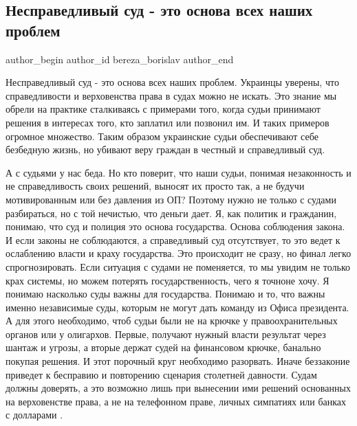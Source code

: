  
 
 
 
 
 
\subsection{Несправедливый суд - это основа всех наших проблем}
\label{sec:28_10_2021.fb.bereza_borislav.1.nespravedlivyj_sud}
 
\ifcmt
 author_begin
   author_id bereza_borislav
 author_end
\fi

Несправедливый суд - это основа всех наших проблем. Украинцы уверены, что
справедливости и верховенства права в судах можно не искать. Это знание мы
обрели на практике сталкиваясь с примерами того, когда судьи принимают решения
в интересах того, кто заплатил или позвонил им. И таких примеров огромное
множество. Таким образом украинские судьи обеспечивают себе безбедную жизнь, но
убивают веру граждан в честный и справедливый суд.

А с судьями у нас беда. Но кто поверит, что наши судьи, понимая незаконность и
не справедливость своих решений, выносят их просто так, а не будучи
мотивированным или без давления из ОП? Поэтому нужно не только с судами
разбираться, но с той нечистью, что деньги дает. Я, как политик и гражданин,
понимаю, что суд и полиция это основа государства. Основа соблюдения закона. И
если законы не соблюдаются, а справедливый суд отсутствует, то это ведет к
ослаблению власти и краху государства. Это происходит не сразу, но финал легко
спрогнозировать. Если ситуация с судами не поменяется, то мы увидим не только
крах системы, но можем потерять государственность, чего я точноне хочу. Я
понимаю насколько суды важны для государства. Понимаю и то, что важны именно
независимые суды, которым не могут дать команду из Офиса президента. А для
этого необходимо, чтоб судьи были не на крючке у правоохранительных органов или
у олигархов. Первые, получают нужный власти результат через шантаж и угрозы, а
вторые держат судей на финансовом крючке, банально покупая решения. И этот
порочный круг необходимо разорвать. Иначе беззаконие приведет к бесправию и
повторению сценария столетней давности. Судам должны доверять, а это возможно
лишь при вынесении ими решений основанных на верховенстве права, а не на
телефонном праве, личных симпатиях или банках с долларами .

